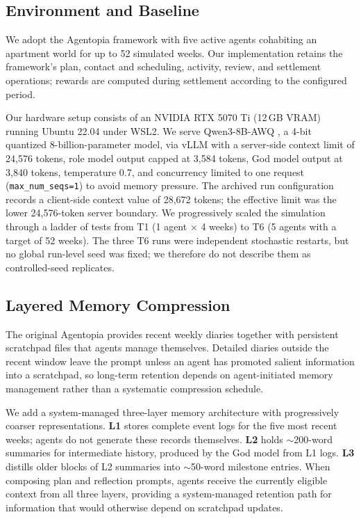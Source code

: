 \documentclass[11pt]{article}
\begin{document}
\subsection{Environment and Baseline}

We adopt the Agentopia framework \citep{wang2026agentopia} with five active agents cohabiting an apartment world for up to 52 simulated weeks.
Our implementation retains the framework's plan, contact and scheduling, activity, review, and settlement operations; rewards are computed during settlement according to the configured period.

Our hardware setup consists of an NVIDIA RTX 5070 Ti (12\,GB VRAM) running Ubuntu 22.04 under WSL2.
We serve Qwen3-8B-AWQ \citep{yang2025qwen3,lin2024awq}, a 4-bit quantized 8-billion-parameter model, via vLLM \citep{kwon2023vllm} with a server-side context limit of 24,576 tokens, role model output capped at 3,584 tokens, God model output at 3,840 tokens, temperature 0.7, and concurrency limited to one request (\texttt{max\_num\_seqs=1}) to avoid memory pressure.
The archived run configuration records a client-side context value of 28,672 tokens; the effective limit was the lower 24,576-token server boundary.
We progressively scaled the simulation through a ladder of tests from T1 (1 agent $\times$ 4 weeks) to T6 (5 agents with a target of 52 weeks).
The three T6 runs were independent stochastic restarts, but no global run-level seed was fixed; we therefore do not describe them as controlled-seed replicates.

\subsection{Layered Memory Compression}

The original Agentopia provides recent weekly diaries together with persistent scratchpad files that agents manage themselves.
Detailed diaries outside the recent window leave the prompt unless an agent has promoted salient information into a scratchpad, so long-term retention depends on agent-initiated memory management rather than a systematic compression schedule.

We add a system-managed three-layer memory architecture with progressively coarser representations.
\textbf{L1} stores complete event logs for the five most recent weeks; agents do not generate these records themselves.
\textbf{L2} holds $\sim$200-word summaries for intermediate history, produced by the God model from L1 logs.
\textbf{L3} distills older blocks of L2 summaries into $\sim$50-word milestone entries.
When composing plan and reflection prompts, agents receive the currently eligible context from all three layers, providing a system-managed retention path for information that would otherwise depend on scratchpad updates.
\end{document}
